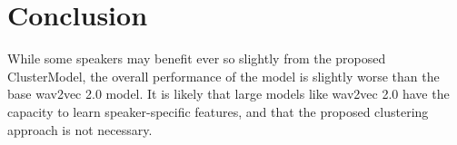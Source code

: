 \section{Conclusion}

While some speakers may benefit ever so slightly from the proposed ClusterModel, the overall performance of the model is slightly worse than the base wav2vec 2.0 model.
It is likely that large models like wav2vec 2.0 have the capacity to learn speaker-specific features, and that the proposed clustering approach is not necessary.


